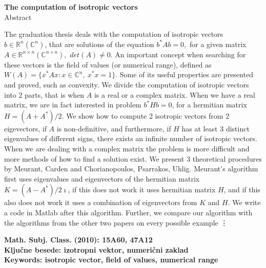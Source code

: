 \documentclass[12pt,a4paper]{amsart}
\theoremstyle{definition}
\theoremstyle{plain}
\newcommand{\R}{\mathbb R}
\newcommand{\C}{\mathbb C}
\begin{document}
\vfill
\begin{center}
{\bf The computation of isotropic vectors}\\[3mm]
{\sc Abstract}
\end{center}
The graduation thesis deals with the computation of isotropic vectors $b\in\R^{n} (\C^{n})$, that are solutions of the equation $b^\ast Ab=0,$ for a given matrix $A\in\R^{n\times n} (\C^{n\times n}),$ $det(A)\ne 0$.
An important concept when searching for these vectors is the field of values (or numerical range), defined as $W(A)=\{x^\ast Ax\! : x \in \C^n,\ x^\ast x=1\}.$ Some of its useful properties are presented and proved, such as convexity.
We divide the computation of isotropic vectors into 2 parts, that is when $A$ is a real or a complex matrix.
When we have a real matrix, we are in fact interested in problem $b^\ast Hb=0$, for a hermitian matrix $H=(A+A^\ast)/2$. 
We show how to compute 2 isotropic vectors from 2 eigevectors, if $A$ is non-definitive, and furthermore, if $H$ has at least 3 distinct eigenvalues of different signs, there exists an infinite number of isotropic vectors.
When we are dealing with a complex matrix the problem is more difficult and more methods of how to find a solution exist. We present 3 theoretical procedures by Meurant, Carden and Chorianopoulos, Psarrakos, Uhlig.
Meurant's algorithm first uses eigenvalues and eigenvectors of the hermitian matrix $K=(A-A^\ast)/2\imath$, if this does not work it uses hermitian matrix $H$, and if this also does not work it uses a combination of eigenvectors from $K$ and $H$.
We write a code in Matlab after this algorithm.
Further, we compare our algorithm with the algorithms from the other two papers on every possible example \vdots


\vfill\noindent
{\bf Math. Subj. Class. (2010): 15A60, 47A12}   \\[1mm]
{\bf Ključne besede: izotropni vektor, numerični zaklad}   \\[1mm]
{\bf Keywords: isotropic vector, field of values, numerical range}
\pagebreak
\end{document}
